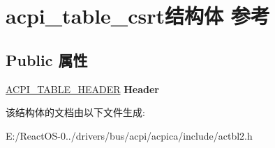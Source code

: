 \hypertarget{structacpi__table__csrt}{}\section{acpi\+\_\+table\+\_\+csrt结构体 参考}
\label{structacpi__table__csrt}
\subsection*{Public 属性}
\begin{DoxyCompactItemize}
\item 
\mbox{\label{structacpi__table__csrt_a238911b3010fa8ce65c75a9ff16f9912}} 
\hyperlink{structacpi__table__header}{A\+C\+P\+I\+\_\+\+T\+A\+B\+L\+E\+\_\+\+H\+E\+A\+D\+ER} {\bfseries Header}
\end{DoxyCompactItemize}


该结构体的文档由以下文件生成\+:\begin{DoxyCompactItemize}
\item 
E\+:/\+React\+O\+S-\/0../drivers/bus/acpi/acpica/include/actbl2.\+h\end{DoxyCompactItemize}
